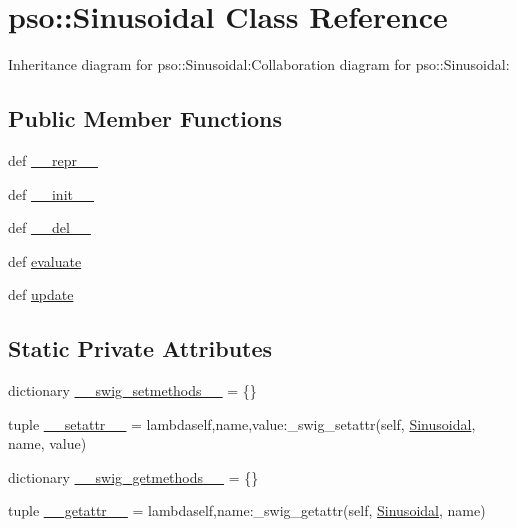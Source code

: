 \hypertarget{classpso_1_1Sinusoidal}{
\section{pso::Sinusoidal Class Reference}
\label{classpso_1_1Sinusoidal}
}
Inheritance diagram for pso::Sinusoidal:Collaboration diagram for pso::Sinusoidal:\subsection*{Public Member Functions}
\begin{CompactItemize}
\item 
def \hyperlink{classpso_1_1Sinusoidal_b6343711af3f82150f169132f230fd80}{\_\-\_\-repr\_\-\_\-}
\item 
def \hyperlink{classpso_1_1Sinusoidal_a75df3138290d6798a97d2ffe7b1c68b}{\_\-\_\-init\_\-\_\-}
\item 
def \hyperlink{classpso_1_1Sinusoidal_8b3ba4783d55a0536cfde0c74c1a8e6e}{\_\-\_\-del\_\-\_\-}
\item 
def \hyperlink{classpso_1_1Sinusoidal_4c9e94b27d920bbee7cb3fc8ac4c09c7}{evaluate}
\item 
def \hyperlink{classpso_1_1Sinusoidal_56ebee67a884bc171cddea452bf12f2e}{update}
\end{CompactItemize}
\subsection*{Static Private Attributes}
\begin{CompactItemize}
\item 
dictionary \hyperlink{classpso_1_1Sinusoidal_7bdd3d830dd4d4cbe4481f4ac2f2db41}{\_\-\_\-swig\_\-setmethods\_\-\_\-} = \{\}
\item 
tuple \hyperlink{classpso_1_1Sinusoidal_102c00e25a425a175159522a597af525}{\_\-\_\-setattr\_\-\_\-} = lambdaself,name,value:\_\-swig\_\-setattr(self, \hyperlink{classpso_1_1Sinusoidal}{Sinusoidal}, name, value)
\item 
dictionary \hyperlink{classpso_1_1Sinusoidal_1e801bb9b7015ee3d86b76df94f2c0a2}{\_\-\_\-swig\_\-getmethods\_\-\_\-} = \{\}
\item 
tuple \hyperlink{classpso_1_1Sinusoidal_99c459f3188801b7e31f13b19af7cd33}{\_\-\_\-getattr\_\-\_\-} = lambdaself,name:\_\-swig\_\-getattr(self, \hyperlink{classpso_1_1Sinusoidal}{Sinusoidal}, name)
\end{CompactItemize}


